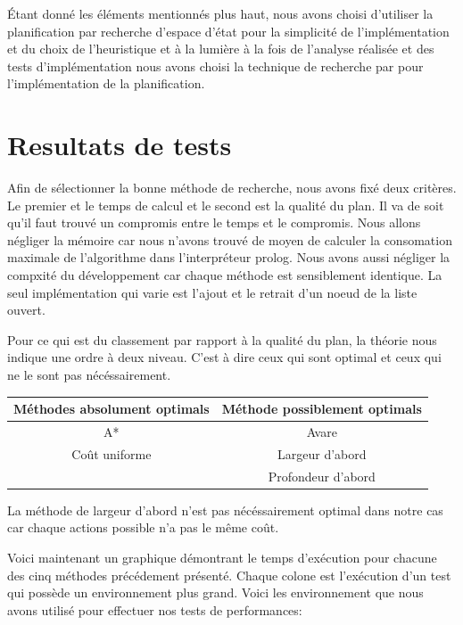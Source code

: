 \documentclass[12pt,english,frenchb,letterpaper]{article}
\begin{document}
Étant donné les éléments mentionnés plus haut, nous avons choisi d'utiliser la planification par recherche d'espace d'état pour la simplicité de l'implémentation et du choix de l'heuristique et à la lumière à la fois de l'analyse réalisée et des tests d'implémentation nous avons choisi la technique de recherche par %
pour l'implémentation de la planification.

\section{Resultats de tests}



Afin de sélectionner la bonne méthode de recherche, nous avons fixé deux critères. Le premier et le temps de calcul et le second est la qualité du plan. Il va de soit qu'il faut trouvé un compromis entre le temps et le compromis. Nous allons négliger la mémoire car nous n'avons trouvé de moyen de calculer la consomation maximale de l'algorithme dans l'interpréteur prolog. Nous avons aussi négliger la compxité du développement car chaque méthode est sensiblement identique. La seul implémentation qui varie est l'ajout et le retrait d'un noeud de la liste ouvert.

Pour ce qui est du classement par rapport à la qualité du plan, la théorie nous indique une ordre à deux niveau. C'est à dire ceux qui sont optimal et ceux qui ne le sont pas nécéssairement.

\begin{center}
  \begin{tabular}{@{} cc @{}}
    \hline
    Méthodes absolument optimals & Méthode possiblement optimals\\ 
    \hline
    A* & Avare\\     
    Coût uniforme & Largeur d'abord \\
    &Profondeur d'abord\\
    \hline
  \end{tabular}
\end{center}

La méthode de largeur d'abord n'est pas nécéssairement optimal dans notre cas car chaque actions possible n'a pas le même coût.

Voici maintenant un graphique démontrant le temps d'exécution pour chacune des cinq méthodes précédement présenté. Chaque colone est l'exécution d'un test qui possède un environnement plus grand. Voici les environnement que nous avons utilisé pour effectuer nos tests de performances:
\end{document}
